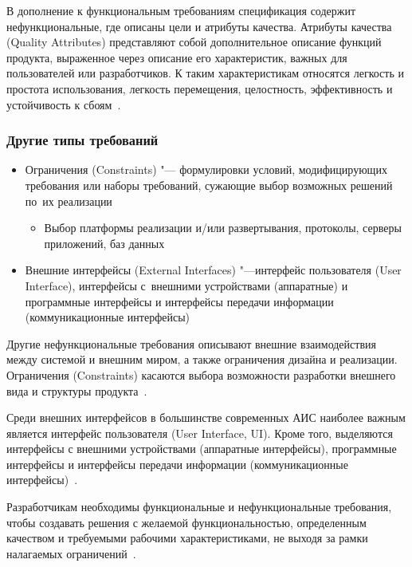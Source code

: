 \documentclass{../industrial-development}
\begin{document}
В дополнение к функциональным требованиям спецификация содержит нефункциональные, где описаны цели и атрибуты качества. \alert{Атрибуты качества (Quality Attributes)} представляют собой дополнительное описание функций продукта, выраженное через описание его характеристик, важных для пользователей или разработчиков. К таким характеристикам относятся легкость и простота использования, легкость перемещения, целостность, эффективность и устойчивость к сбоям~\cite[с.~10]{Wiegers}.


\begin{frame} \frametitle{Другие типы требований}
	\begin{itemize}
\item \alert{Ограничения} (Constraints) "--- формулировки условий, модифицирующих требования или наборы требований, сужающие выбор возможных решений по~их реализации
\begin{itemize}
	\item Выбор платформы реализации и/или развертывания, протоколы, серверы приложений, баз данных
\end{itemize}
\item \alert{Внешние интерфейсы} (External Interfaces) "---интерфейс пользователя (User Interface), интерфейсы с~внешними устройствами (аппаратные) и программные интерфейсы и интерфейсы передачи информации (коммуникационные интерфейсы)
	\end{itemize}
	\end{frame}

\lecturenotes

Другие нефункциональные требования описывают внешние взаимодействия между системой и внешним миром, а также ограничения дизайна и реализации. \alert{Ограничения (Constraints)} касаются выбора возможности разработки внешнего вида и структуры продукта~\cite[с.~10]{Wiegers}.

Среди \alert{внешних интерфейсов} в большинстве современных АИС наиболее важным является интерфейс пользователя (User Interface, UI). Кроме того, выделяются интерфейсы с внешними устройствами (аппаратные интерфейсы), программные интерфейсы и интерфейсы передачи информации (коммуникационные интерфейсы)~\cite[с.~10]{Maglinec}.

Разработчикам необходимы функциональные и нефункциональные требования, чтобы создавать решения с желаемой функциональностью, определенным качеством и требуемыми рабочими характеристиками, не выходя за рамки налагаемых ограничений~\cite[с.~11]{Wiegers}.
\end{document}
